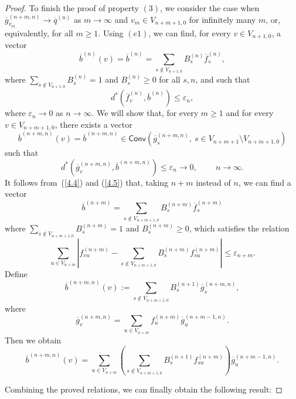 \documentclass[11pt, english, reqno]{amsart}
\theoremstyle{definition}
\theoremstyle{remark}
\theoremstyle{plain}
\def\ov{\overline}
\numberwithin{equation}{section}
\begin{document}
{\begin{proof}
To finish the proof of property $(3)$, we consider the case when $\ov
g_{v_m}^{(n+m,n)} \rightarrow \ov q^{(n)}$ as $m \rightarrow \infty$ and
$v_m \in V_{n+m+1,0}$ for infinitely many $m$, or, equivalently, for all $m
\geq 1$. Using $(e1)$, we can find, for every $v \in V_{n+1,0}$,  a vector
\begin{equation}\label{4.4}
\ov b^{(n)}(v) = \ov b^{(n)} = \sum_{s \notin V_{n+1,0}} B_s^{(n)}\ov
f_s^{(n)},
\end{equation}
where $\sum_{s \notin V_{n+1,0}} B_s^{(n)} = 1$ and $B_s^{(n)} \geq 0$
for all $s,n$, and such that
\begin{equation}\label{4.5}
d^*(\ov f_v^{(n)}, \ov b^{(n)}) \leq \varepsilon_n,
\end{equation}
where $\varepsilon_n \to 0 $ as $n\to \infty$.
We will show that, for every $m \geq 1$ and for every $v \in V_{n+m+1,0}$,
there exists a vector
$$
\ov b^{(n+m,n)}(v) = \ov b^{(n+m,n)} \in \mathsf{Conv}(\ov
g_s^{(n+m,n)}, \ s \in V_{n+m+1} \setminus V_{n+m+1,0})
$$
such that
$$
d^*(\ov g_v^{(n+m,n)}, \ov b^{(n+m,n)}) \leq \varepsilon_n \rightarrow 0,
\qquad \  n\to \infty.
$$
It follows from~(\ref{4.4}) and (\ref{4.5}) that, taking $n+m$ instead of $n$,
 we can find a vector
 $$\ov b^{(n+m)} = \sum_{s \notin V_{n+m+1,0}}
B_s^{(n+m)}\ov f_s^{(n+m)}
$$
where  $\sum_{s \notin V_{n+m+1,0}} B_s^{(n+m)} = 1$ and
$B_s^{(n+m)} \geq 0$, which  satisfies the relation
$$
\sum_{u \in V_{n+m}} \left|f_{vu}^{(n+m)} - \sum_{s \notin V_{n+m+1,0}}
B_s^{(n+m)}f_{su}^{(n+m)}\right| \leq \varepsilon_{n+m}.
$$
Define
$$
\ov b^{(n+m,n)}(v):= \sum_{s \notin V_{n+m+1,0}} B_s^{(n+1)} \ov
g_s^{(n+m,n)},
$$
where
$$\ov g_v^{(n+m,n)} = \sum_{u \in V_{n+m}} f_u^{(n+m)} \ov
g_u^{(n+m-1,n)}.
$$
Then we obtain
$$
\ov b^{(n+m,n)}(v) = \sum_{u \in V_{n+m}}\left(\sum_{s \notin
V_{n+m+1,0}}B_s^{(n+1)} f_{su}^{(n+m)}\right)\ov g_{u}^{(n+m-1,n)}.
$$

Combining the proved relations, we can finally obtain the following result:


\end{proof}}
\end{document}
